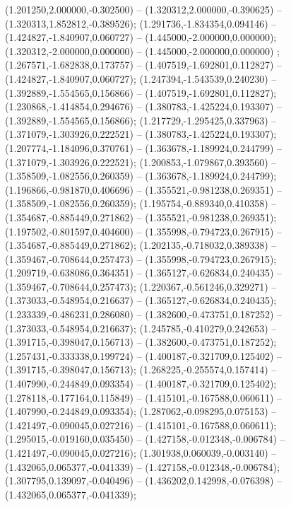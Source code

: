  (1.201250,2.000000,-0.302500) -- (1.320312,2.000000,-0.390625) -- (1.320313,1.852812,-0.389526);
 (1.291736,-1.834354,0.094146) -- (1.424827,-1.840907,0.060727) -- (1.445000,-2.000000,0.000000);
 (1.320312,-2.000000,0.000000) -- (1.445000,-2.000000,0.000000) ;
 (1.267571,-1.682838,0.173757) -- (1.407519,-1.692801,0.112827) -- (1.424827,-1.840907,0.060727);
 (1.247394,-1.543539,0.240230) -- (1.392889,-1.554565,0.156866) -- (1.407519,-1.692801,0.112827);
 (1.230868,-1.414854,0.294676) -- (1.380783,-1.425224,0.193307) -- (1.392889,-1.554565,0.156866);
 (1.217729,-1.295425,0.337963) -- (1.371079,-1.303926,0.222521) -- (1.380783,-1.425224,0.193307);
 (1.207774,-1.184096,0.370761) -- (1.363678,-1.189924,0.244799) -- (1.371079,-1.303926,0.222521);
 (1.200853,-1.079867,0.393560) -- (1.358509,-1.082556,0.260359) -- (1.363678,-1.189924,0.244799);
 (1.196866,-0.981870,0.406696) -- (1.355521,-0.981238,0.269351) -- (1.358509,-1.082556,0.260359);
 (1.195754,-0.889340,0.410358) -- (1.354687,-0.885449,0.271862) -- (1.355521,-0.981238,0.269351);
 (1.197502,-0.801597,0.404600) -- (1.355998,-0.794723,0.267915) -- (1.354687,-0.885449,0.271862);
 (1.202135,-0.718032,0.389338) -- (1.359467,-0.708644,0.257473) -- (1.355998,-0.794723,0.267915);
 (1.209719,-0.638086,0.364351) -- (1.365127,-0.626834,0.240435) -- (1.359467,-0.708644,0.257473);
 (1.220367,-0.561246,0.329271) -- (1.373033,-0.548954,0.216637) -- (1.365127,-0.626834,0.240435);
 (1.233339,-0.486231,0.286080) -- (1.382600,-0.473751,0.187252) -- (1.373033,-0.548954,0.216637);
 (1.245785,-0.410279,0.242653) -- (1.391715,-0.398047,0.156713) -- (1.382600,-0.473751,0.187252);
 (1.257431,-0.333338,0.199724) -- (1.400187,-0.321709,0.125402) -- (1.391715,-0.398047,0.156713);
 (1.268225,-0.255574,0.157414) -- (1.407990,-0.244849,0.093354) -- (1.400187,-0.321709,0.125402);
 (1.278118,-0.177164,0.115849) -- (1.415101,-0.167588,0.060611) -- (1.407990,-0.244849,0.093354);
 (1.287062,-0.098295,0.075153) -- (1.421497,-0.090045,0.027216) -- (1.415101,-0.167588,0.060611);
 (1.295015,-0.019160,0.035450) -- (1.427158,-0.012348,-0.006784) -- (1.421497,-0.090045,0.027216);
 (1.301938,0.060039,-0.003140) -- (1.432065,0.065377,-0.041339) -- (1.427158,-0.012348,-0.006784);
 (1.307795,0.139097,-0.040496) -- (1.436202,0.142998,-0.076398) -- (1.432065,0.065377,-0.041339);
